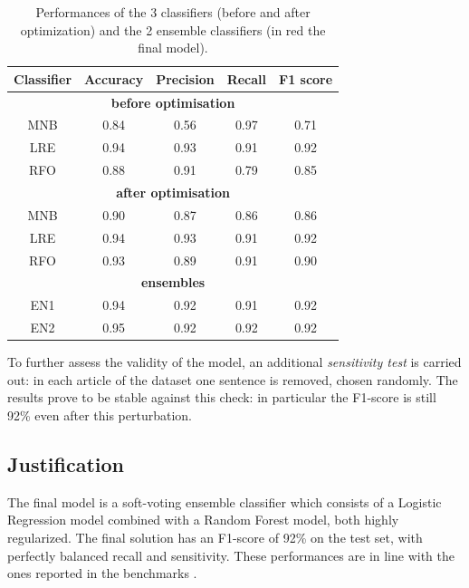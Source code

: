 \documentclass[a4paper,12pt]{article} %
\begin{document}
\begin{table}
\begin{center}
\begin{tabular}{ c | c | c | c | c }
\textbf{Classifier} & \textbf{Accuracy} & \textbf{Precision} & \textbf{Recall} & \textbf{F1 score} \\ \hline
\multicolumn{5}{c}{\textbf{before optimisation}} \\ \hline
MNB & 0.84 & 0.56 & 0.97 & 0.71 \\ \hline
LRE & 0.94 & 0.93 & 0.91 & 0.92 \\ \hline
RFO & 0.88 & 0.91 & 0.79 & 0.85 \\ \hline
\multicolumn{5}{c}{\textbf{after optimisation}} \\ \hline
MNB & 0.90 & 0.87 & 0.86 & 0.86 \\ \hline
LRE & 0.94 & 0.93 & 0.91 & 0.92 \\ \hline
RFO & 0.93 & 0.89 & 0.91 & 0.90 \\ \hline
\multicolumn{5}{c}{\textbf{ensembles}} \\ \hline
EN1 & 0.94 & 0.92 & 0.91 & 0.92 \\ \hline
{\color{red} EN2} & {\color{red} 0.95} & {\color{red} 0.92} & {\color{red} 0.92} & {\color{red} 0.92} \\ \hline
\end{tabular}
\end{center}
\caption{Performances of the 3 classifiers (before and after optimization)
and the 2 ensemble classifiers (in red the final model).
\label{tab:results}}
\end{table}

To further assess the validity of the model, an additional \textit{sensitivity test} is carried out:
in each article of the dataset one sentence is removed, chosen randomly.
The results prove to be stable against this check: in particular the F1-score
is still 92\% even after this perturbation.


\subsection{Justification}
The final model is a soft-voting ensemble classifier which
consists of a Logistic Regression model combined with a Random Forest model,
both highly regularized.
The final solution has an F1-score of 92\% on the test set,
with perfectly balanced recall and sensitivity. These performances are
in line with the ones reported in the benchmarks \cite{NYDSA, jarmul}.
\end{document}

